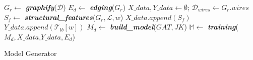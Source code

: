 \setlength{\textfloatsep}{0pt}
\begin{algorithm}[!t]
\DontPrintSemicolon %

$G_r \gets$ \textbf{\textit{graphify}}($\mathcal{D}$) \;
$E_d \gets$ \textbf{\textit{edging}}($G_r$) \;
$X\_data, Y\_data \gets \emptyset $; 
$\mathcal{D}_{wires} \gets G_r.wires$ \;
{
    $S_f \gets$ \textbf{\textit{structural\_features}}($G_r,\mathcal{L},w$)\;
    $X\_data.append(S_f)$ \;
    $Y\_data.append(\mathcal{T}_{lb}[w])$ \;
}
$M_d \gets$ \textbf{\textit{build\_model}}($GAT, JK$) \;
$\mathbb{M} \gets$ \textbf{\textit{training}}($M_d, X\_data$,$Y\_data, E_d$)\;
\;
\caption{Model Generator}
\label{algo:Model Genesis}
\end{algorithm}